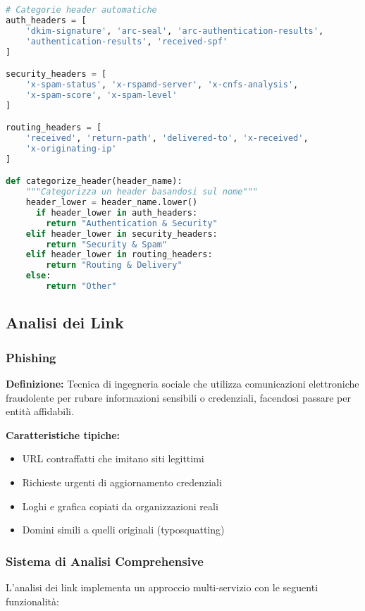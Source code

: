 \documentclass{article}
\begin{document}
\begin{lstlisting}[language=Python, caption=Esempio categorizzazione header]
# Categorie header automatiche
auth_headers = [
    'dkim-signature', 'arc-seal', 'arc-authentication-results', 
    'authentication-results', 'received-spf'
]

security_headers = [
    'x-spam-status', 'x-rspamd-server', 'x-cnfs-analysis',
    'x-spam-score', 'x-spam-level'
]

routing_headers = [
    'received', 'return-path', 'delivered-to', 'x-received',
    'x-originating-ip'
]

def categorize_header(header_name):
    """Categorizza un header basandosi sul nome"""
    header_lower = header_name.lower()
      if header_lower in auth_headers:
        return "Authentication & Security"
    elif header_lower in security_headers:
        return "Security & Spam"
    elif header_lower in routing_headers:
        return "Routing & Delivery"
    else:
        return "Other"
\end{lstlisting}

\subsection{Analisi dei Link}

\subsubsection{Phishing}
\textbf{Definizione:} Tecnica di ingegneria sociale che utilizza comunicazioni elettroniche fraudolente per rubare informazioni sensibili o credenziali, facendosi passare per entità affidabili.

\textbf{Caratteristiche tipiche:}
\begin{itemize}
    \item URL contraffatti che imitano siti legittimi
    \item Richieste urgenti di aggiornamento credenziali
    \item Loghi e grafica copiati da organizzazioni reali
    \item Domini simili a quelli originali (typosquatting)
\end{itemize}

\subsubsection{Sistema di Analisi Comprehensive}

L'analisi dei link implementa un approccio multi-servizio con le seguenti funzionalità:
\end{document}
